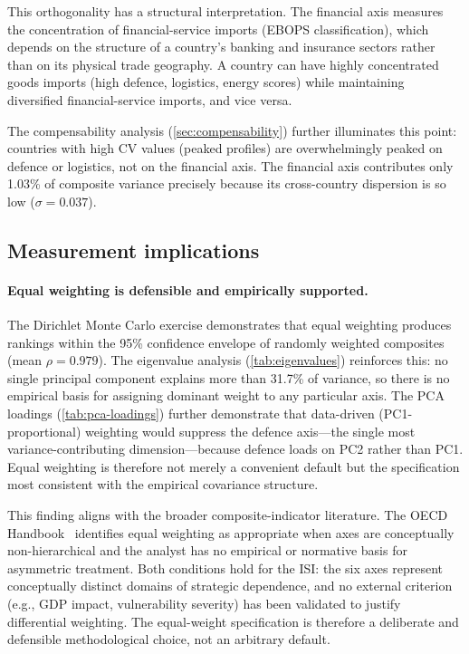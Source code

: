 This orthogonality has a structural interpretation.  The financial
axis measures the concentration of financial-service imports
(EBOPS classification), which depends on the structure of a country's
banking and insurance sectors rather than on its physical trade
geography.  A country can have highly concentrated goods imports
(high defence, logistics, energy scores) while maintaining
diversified financial-service imports, and vice versa.

The compensability analysis (\cref{sec:compensability}) further
illuminates this point: countries with high CV values (peaked
profiles) are overwhelmingly peaked on defence or logistics, not on
the financial axis.  The financial axis contributes only 1.03\% of
composite variance precisely because its cross-country dispersion
is so low ($\sigma = 0.037$).

\subsection{Measurement implications}

\paragraph{Equal weighting is defensible and empirically supported.}
The Dirichlet Monte Carlo exercise demonstrates that equal weighting
produces rankings within the 95\% confidence envelope of randomly
weighted composites (mean $\rho = 0.979$).  The eigenvalue analysis
(\cref{tab:eigenvalues}) reinforces this: no single principal
component explains more than 31.7\% of variance, so there is no
empirical basis for assigning dominant weight to any particular axis.
The PCA loadings (\cref{tab:pca-loadings}) further demonstrate that
data-driven (PC1-proportional) weighting would suppress the defence
axis---the single most variance-contributing dimension---because
defence loads on PC2 rather than PC1.  Equal weighting is therefore
not merely a convenient default but the specification most consistent
with the empirical covariance structure.

This finding aligns with the broader composite-indicator literature.
The OECD Handbook~\cite{oecd_handbook_2008} identifies equal weighting
as appropriate when axes are conceptually non-hierarchical and the
analyst has no empirical or normative basis for asymmetric treatment.
Both conditions hold for the ISI: the six axes represent conceptually
distinct domains of strategic dependence, and no external criterion
(e.g., GDP impact, vulnerability severity) has been validated to
justify differential weighting.  The equal-weight specification is
therefore a deliberate and defensible methodological choice, not an
arbitrary default.


